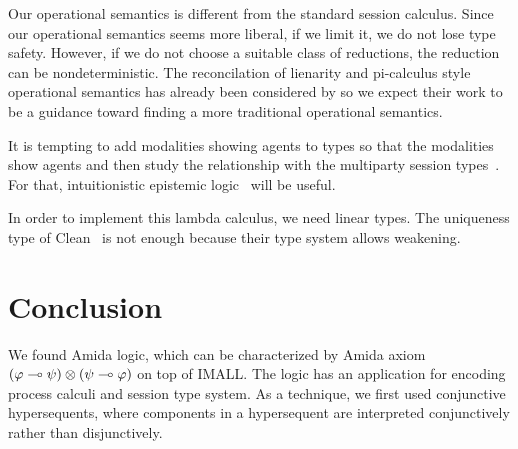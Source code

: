 Our operational semantics is different from the standard session
calculus.  Since our operational semantics seems more liberal,
if we limit it, we do not lose type safety.  However, if we do not
choose a suitable class of reductions, the reduction can be
nondeterministic.
The reconcilation of lienarity and pi-calculus style operational
semantics has already been considered by
\citet{kobayashi-pierce-turner} so we expect their work to be a
guidance toward finding a more traditional operational semantics.

It is tempting to add modalities showing agents to types so that the
modalities show agents and then study the relationship with the
multiparty session types~\citep{sync-multi-session, async-multi-session}.
For that, intuitionistic epistemic logic~\citet{hirailpar,hiraimaster}
will be useful.

In order to implement this lambda calculus, we need linear types.
The uniqueness type of Clean~ is not enough because
their type system allows weakening.


\section{Conclusion}

We found Amida logic, which can be characterized by Amida axiom
$(\varphi\multimap\psi)\otimes(\psi\multimap\varphi)$ on top of IMALL.
The logic has an application for encoding process calculi and session type
system.
As a technique, we first used conjunctive hypersequents,
where components in a hypersequent are interpreted conjunctively rather
than disjunctively.